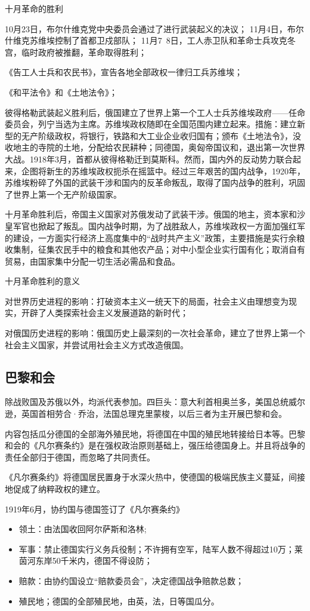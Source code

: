十月革命的胜利

10月23日，布尔什维克党中央委员会通过了进行武装起义的决议；
11月4日，布尔什维克苏维埃控制了首都卫戍部队；
11月7~8日，工人赤卫队和革命士兵攻克冬宫，临时政府被推翻，革命取得胜利；

《告工人士兵和农民书》，宣告各地全部政权一律归工兵苏维埃；

《和平法令》和《土地法令》；

彼得格勒武装起义胜利后，俄国建立了世界上第一个工人士兵苏维埃政府——任命委员会，列宁当选为主席。苏维埃政权随即在全国范围内建立起来。措施：建立新型的无产阶级政权，将银行，铁路和大工业企业收归国有；颁布《土地法令》，没收地主的寺院的土地，分配给农民耕种；同德国，奥匈帝国议和，退出第一次世界大战。1918年3月，首都从彼得格勒迁到莫斯科。然而，国内外的反动势力联合起来，企图将新生的苏维埃政权扼杀在摇篮中。经过三年艰苦的国内战争，1920年，苏维埃粉碎了外国的武装干涉和国内的反革命叛乱，取得了国内战争的胜利，巩固了世界上第一个无产阶级国家。

十月革命胜利后，帝国主义国家对苏俄发动了武装干涉。俄国的地主，资本家和沙皇军官也掀起了叛乱。国内战争时期，为了战胜敌人，苏维埃政权一方面加强红军的建设，一方面实行经济上高度集中的“战时共产主义”政策，主要措施是实行余粮收集制，征集农民手中的粮食和其他农产品；对中小型企业实行国有化；取消自有贸易，由国家集中分配一切生活必需品和食品。

十月革命胜利的意义

对世界历史进程的影响：打破资本主义一统天下的局面，社会主义由理想变为现实，开辟了人类探索社会主义发展道路的新时代；

对俄国历史进程的影响：俄国历史上最深刻的一次社会革命，建立了世界上第一个社会主义国家，并尝试用社会主义方式改造俄国。

\subsection{巴黎和会}
除战败国及苏俄以外，均派代表参加。四巨头：意大利首相奥兰多，美国总统威尔逊，英国首相劳合·乔治，法国总理克里蒙梭，以后三者为主开展巴黎和会。

内容包括瓜分德国的全部海外殖民地，将德国在中国的殖民地转接给日本等。巴黎和会的《凡尔赛条约》是在强权政治原则基础上，强压给德国身上。并且将战争的责任全部归于德国，而忽略了共同责任。

《凡尔赛条约》将德国居民置身于水深火热中，使德国的极端民族主义蔓延，间接地促成了纳粹政权的建立。

1919年6月，协约国与德国签订了《凡尔赛条约》
\begin{itemize}
    \item 领土：由法国收回阿尔萨斯和洛林;
    \item 军事：禁止德国实行义务兵役制；不许拥有空军，陆军人数不得超过10万；莱茵河东岸50千米内，德国不得设防；
    \item 赔款：由协约国设立“赔款委员会”，决定德国战争赔款总数；
    \item 殖民地；德国的全部殖民地，由英，法，日等国瓜分。
\end{itemize}

